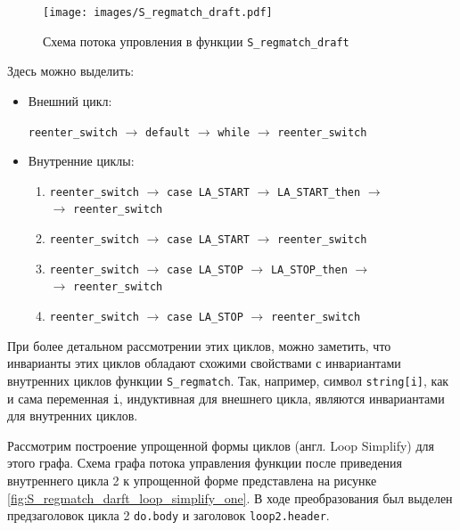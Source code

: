 \begin{figure}
    \centering
    \texttt{[image: images/S\_regmatch\_draft.pdf]}
    \caption{Схема потока упровления в функции \texttt{S\_regmatch\_draft}}
    \label{fig:S_regmatch_darft}
\end{figure}

Здесь можно выделить:
\begin{itemize}
    \item Внешний цикл:

        \texttt{reenter\_switch} $\rightarrow$ \texttt{default} $\rightarrow$ \texttt{while} $\rightarrow$ \texttt{reenter\_switch}

    \item Внутренние циклы:

        \begin{enumerate}
            \item \texttt{reenter\_switch} $\rightarrow$ \texttt{case LA\_START} $\rightarrow$ \texttt{LA\_START\_then} $\rightarrow$\\ $\rightarrow$ \texttt{reenter\_switch}
            \item \texttt{reenter\_switch} $\rightarrow$ \texttt{case LA\_START} $\rightarrow$ \texttt{reenter\_switch}
            \item \texttt{reenter\_switch} $\rightarrow$ \texttt{case LA\_STOP} $\rightarrow$ \texttt{LA\_STOP\_then} $\rightarrow$\\$\rightarrow$ \texttt{reenter\_switch}
            \item \texttt{reenter\_switch} $\rightarrow$ \texttt{case LA\_STOP} $\rightarrow$ \texttt{reenter\_switch}
        \end{enumerate}
\end{itemize}

При более детальном рассмотрении этих циклов, можно заметить, что инварианты этих циклов обладают схожими свойствами с инвариантами внутренних циклов функции \texttt{S\_regmatch}.
Так, например, символ \texttt{string[i]}, как и сама переменная \texttt{i}, индуктивная для внешнего цикла, являются инвариантами для внутренних циклов.

Рассмотрим построение упрощенной формы циклов (англ. Loop Simplify) для этого графа.
Схема графа потока управления функции после приведения внутреннего цикла 2 к упрощенной форме представлена на рисунке \ref{fig:S_regmatch_darft_loop_simplify_one}.
В ходе преобразования был выделен предзаголовок цикла 2 \texttt{do.body} и заголовок \texttt{loop2.header}.

